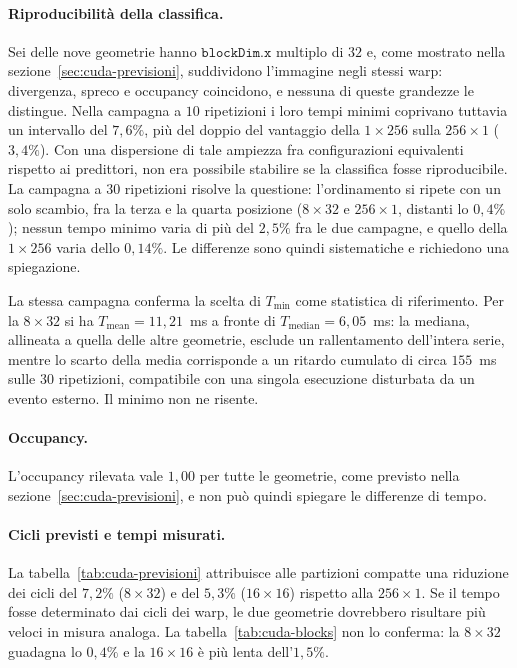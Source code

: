 \paragraph{Riproducibilità della classifica.}
Sei delle nove geometrie hanno $\texttt{blockDim.x}$ multiplo di $32$ e, come mostrato
nella sezione~\ref{sec:cuda-previsioni}, suddividono l'immagine negli stessi warp: divergenza, spreco e
occupancy coincidono, e nessuna di queste grandezze le distingue. Nella campagna
a $10$ ripetizioni i loro tempi minimi coprivano tuttavia un intervallo del
$7{,}6\%$, più del doppio del vantaggio della $1{\times}256$ sulla $256{\times}1$
($3{,}4\%$). Con una dispersione di tale ampiezza fra configurazioni equivalenti
rispetto ai predittori, non era possibile stabilire se la classifica fosse
riproducibile. La campagna a $30$ ripetizioni risolve la questione: l'ordinamento
si ripete con un solo scambio, fra la terza e la quarta posizione ($8{\times}32$
e $256{\times}1$, distanti lo $0{,}4\%$); nessun tempo minimo varia di più del
$2{,}5\%$ fra le due campagne, e quello della $1{\times}256$ varia dello
$0{,}14\%$. Le differenze sono quindi sistematiche e richiedono una spiegazione.

La stessa campagna conferma la scelta di $T_{\min}$ come statistica di
riferimento. Per la $8{\times}32$ si ha $T_{\text{mean}} = 11{,}21$~ms a fronte
di $T_{\text{median}} = 6{,}05$~ms: la mediana, allineata a quella delle altre
geometrie, esclude un rallentamento dell'intera serie, mentre lo scarto della
media corrisponde a un ritardo cumulato di circa $155$~ms sulle $30$ ripetizioni,
compatibile con una singola esecuzione disturbata da un evento esterno. Il minimo
non ne risente.

\paragraph{Occupancy.}
L'occupancy rilevata vale $1{,}00$ per tutte le geometrie, come previsto nella
sezione~\ref{sec:cuda-previsioni}, e non può quindi spiegare le differenze di tempo.

\paragraph{Cicli previsti e tempi misurati.}
La tabella~\ref{tab:cuda-previsioni} attribuisce alle partizioni compatte una
riduzione dei cicli del $7{,}2\%$ ($8{\times}32$) e del $5{,}3\%$ ($16{\times}16$)
rispetto alla $256{\times}1$. Se il tempo fosse determinato dai cicli dei warp, le
due geometrie dovrebbero risultare più veloci in misura analoga. La
tabella~\ref{tab:cuda-blocks} non lo conferma: la $8{\times}32$ guadagna lo
$0{,}4\%$ e la $16{\times}16$ è più lenta dell'$1{,}5\%$.

